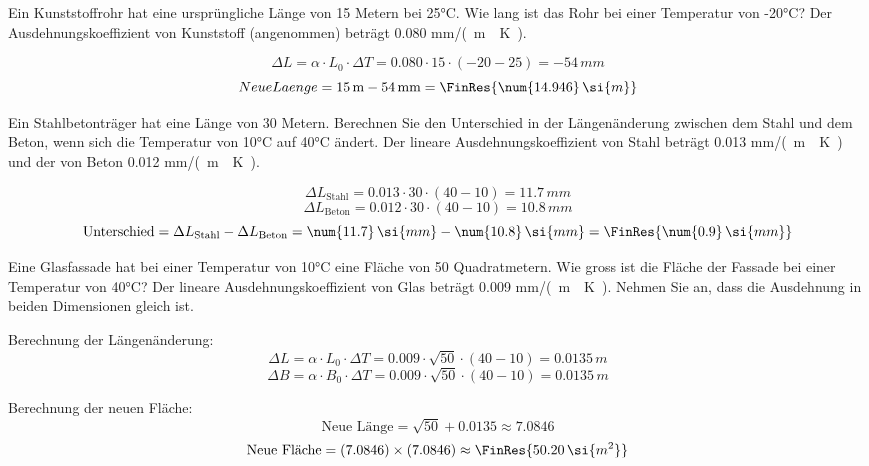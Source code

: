 \begin{questions}
\question Ein Kunststoffrohr hat eine ursprüngliche Länge von 15 Metern bei 25°C. Wie lang ist das Rohr bei einer Temperatur von -20°C? Der Ausdehnungskoeffizient von Kunststoff (angenommen) beträgt \num{0.080} \si{mm/(m\cdot K)}.
\begin{solution}
    \[ \Delta L = \alpha \cdot L_0 \cdot \Delta T = \num{0.080} \cdot 15 \cdot (-20 - 25) = \num{-54} \, \si{mm} \]
    \[ Neue Laenge = 15 \, \text{m} - 54 \, \text{mm} = \FinRes{\num{14.946} \, \si{m}} \]
\end{solution}



\question Ein Stahlbetonträger hat eine Länge von 30 Metern. Berechnen Sie den Unterschied in der Längenänderung zwischen dem Stahl und dem Beton, wenn sich die Temperatur von 10°C auf 40°C ändert. Der lineare Ausdehnungskoeffizient von Stahl beträgt \num{0.013} \si{mm/(m\cdot K)} und der von Beton \num{0.012} \si{mm/(m\cdot K)}.
\begin{solution}
    \[ \Delta L_{\text{Stahl}} = \num{0.013} \cdot 30 \cdot (40 - 10) = \num{11.7} \, \si{mm} \]
    \[ \Delta L_{\text{Beton}} = \num{0.012} \cdot 30 \cdot (40 - 10) = \num{10.8} \, \si{mm} \]
    \[ \text{Unterschied} = \Delta L_{\text{Stahl}} - \Delta L_{\text{Beton}} = \num{11.7} \, \si{mm} - \num{10.8} \, \si{mm} = \FinRes{\num{0.9} \, \si{mm}} \]
\end{solution}

\question Eine Glasfassade hat bei einer Temperatur von 10°C eine Fläche von 50 Quadratmetern. Wie gross ist die Fläche der Fassade bei einer Temperatur von 40°C? Der lineare Ausdehnungskoeffizient von Glas beträgt \num{0.009} \si{mm/(m\cdot K)}. Nehmen Sie an, dass die Ausdehnung in beiden Dimensionen gleich ist.
\begin{solution}
    Berechnung der Längenänderung:
    \[
    \Delta L = \alpha \cdot L_0 \cdot \Delta T = 0.009 \cdot \sqrt{50} \cdot (40 - 10) = 0.0135 \, \si{m}
    \]
    \[
    \Delta B = \alpha \cdot B_0 \cdot \Delta T = 0.009 \cdot \sqrt{50} \cdot (40 - 10) = 0.0135 \, \si{m}
    \]
    
    Berechnung der neuen Fläche:
    \[
    \text{Neue Länge} = \sqrt{50} + 0.0135 \approx 7.0846
    \]
    \[
    \text{Neue Fläche} = (7.0846) \times (7.0846) \approx \FinRes{50.20 \, \si{m^2}}
    \]
\end{solution}

\end{questions}

